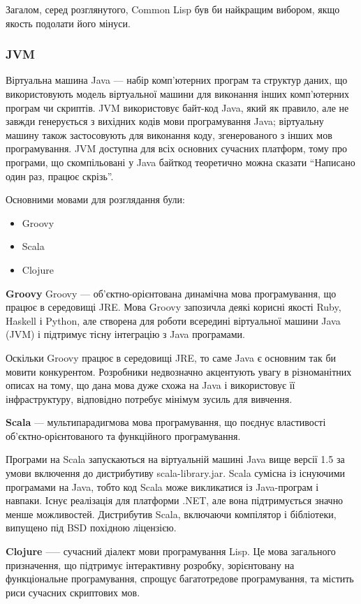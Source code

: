 Загалом, серед розглянутого, Common Lisp був би найкращим вибором, якщо якость подолати його мінуси.
\subsubsection{JVM}
Віртуальна машина Java --- набір комп'ютерних програм та структур даних, що використовують модель віртуальної машини для виконання інших комп'ютерних програм чи скриптів. JVM використовує байт-код Java, який як правило, але не завжди генерується з вихідних кодів мови програмування Java; віртуальну машину також застосовують для виконання коду, згенерованого з інших мов програмування. JVM доступна для всіх основних сучасних платформ, тому про програми, що скомпільовані у Java байткод теоретично можна сказати ``Написано один раз, працює скрізь''.

Основними мовами для розглядання були:
\begin{itemize}
	\item Groovy
	\item Scala
	\item Clojure
\end{itemize}

\textbf{Groovy}
Groovy — об'єктно-орієнтована динамічна мова програмування, що працює в середовищі JRE. Мова Groovy запозичла деякі корисні якості Ruby, Haskell і Python, але створена для роботи всередині віртуальної машини Java (JVM) і підтримує тісну інтеграцію з Java програмами.

Оскільки Groovy працює в середовищі JRE, то саме Java є основним так би мовити конкурентом. Розробники недвозначно акцентують увагу в різноманітних описах на тому, що дана мова дуже схожа на Java і використовує її інфраструктуру, відповідно потребує мінімум зусиль для вивчення.

\textbf{Scala} --- мультипарадигмова мова програмування, що поєднує властивості об'єктно-орієнтованого та функційного програмування.

Програми на Scala запускаються на віртуальній машині Java вище версії 1.5 за умови включення до дистрибутиву scala-library.jar. Scala сумісна із існуючими програмами на Java, тобто код Scala може викликатися із Java-програм і навпаки. Існує реалізація для платформи .NET, але вона підтримується значно менше можливостей. Дистрибутив Scala, включаючи компілятор і бібліотеки, випущено під BSD похідною ліцензією.

\textbf{Clojure} --— сучасний діалект мови програмування Lisp. Це мова загального призначення, що підтримує інтерактивну розробку, зорієнтовану на функціональне програмування, спрощує багатотредове програмування, та містить риси сучасних скриптових мов.

